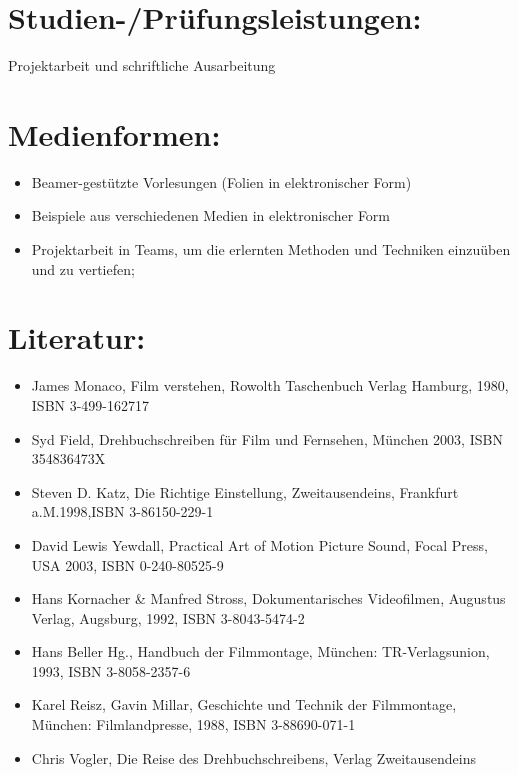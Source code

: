 \section*{Studien-/Prüfungsleistungen:}\label{studien-pruxfcfungsleistungen-2}

Projektarbeit und schriftliche Ausarbeitung

\section*{Medienformen:}\label{medienformen-2}

\begin{itemize}
\tightlist
\item
  Beamer-gestützte Vorlesungen (Folien in elektronischer Form)
\item
  Beispiele aus verschiedenen Medien in elektronischer Form
\item
  Projektarbeit in Teams, um die erlernten Methoden und Techniken
  einzuüben und zu vertiefen;
\end{itemize}

\section*{Literatur:}\label{literatur-2}

\begin{itemize}
\tightlist
\item
  James Monaco, Film verstehen, Rowolth Taschenbuch Verlag Hamburg,
  1980, ISBN 3-499-162717
\item
  Syd Field, Drehbuchschreiben für Film und Fernsehen, München 2003,
  ISBN 354836473X
\item
  Steven D. Katz, Die Richtige Einstellung, Zweitausendeins, Frankfurt
  a.M.1998,ISBN 3-86150-229-1
\item
  David Lewis Yewdall, Practical Art of Motion Picture Sound, Focal
  Press, USA 2003, ISBN 0-240-80525-9
\item
  Hans Kornacher \& Manfred Stross, Dokumentarisches Videofilmen,
  Augustus Verlag, Augsburg, 1992, ISBN 3-8043-5474-2
\item
  Hans Beller Hg., Handbuch der Filmmontage, München: TR-Verlagsunion,
  1993, ISBN 3-8058-2357-6
\item
  Karel Reisz, Gavin Millar, Geschichte und Technik der Filmmontage,
  München: Filmlandpresse, 1988, ISBN 3-88690-071-1
\item
  Chris Vogler, Die Reise des Drehbuchschreibens, Verlag Zweitausendeins
\end{itemize}


